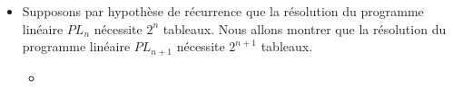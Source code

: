\begin{td-exo}
\begin{enumerate}
\begin{itemize}
\begin{itemize}
\begin{equation*}
				\end{equation*}
				et \(A\) est la matrice associé au \(n-1\) premières contraintes.
			\end{itemize}
			\item Supposons par hypothèse de récurrence que la résolution du programme linéaire 
			\(PL_n\) nécessite \(2^n\) tableaux. Nous allons montrer que la résolution du
			programme linéaire \(PL_{n+1}\) nécessite \(2^{n+1}\) tableaux.
			\begin{itemize}
				\item 
			\end{itemize}
		\end{itemize}
	\end{enumerate}
\end{td-exo}

